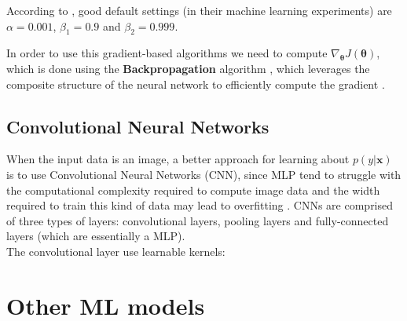 According to \cite{kingma2017}, good default settings (in their machine learning experiments) are $\alpha=0.001$, $\beta_1=0.9$ and $\beta_2 = 0.999$.

In order to use this gradient-based algorithms we need to compute $\nabla_{\boldsymbol{\theta}} J(\boldsymbol{\theta})$, which is done using the \textbf{Backpropagation} algorithm \cite{rumelhart1986}, which leverages the composite structure of the neural network to efficiently compute the gradient \cite{damadi2023}.

\subsection{Convolutional Neural Networks}

When the input data is an image, a better approach for learning about $p(y | \mathbf{x})$ is to use Convolutional Neural Networks (CNN), since MLP tend to struggle with the computational complexity required to compute image data and the width required to train this kind of data may lead to overfitting \cite{oshea2015}. CNNs are comprised of three types of layers: convolutional layers, pooling layers and fully-connected layers (which are essentially a MLP).\\
The convolutional layer use learnable kernels:
\section{Other ML models}
